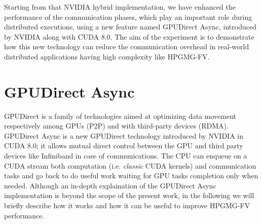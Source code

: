 \documentclass[review]{siamart1116}
\begin{document}

Starting from that NVIDIA hybrid implementation, we have enhanced the
performance of the communication phases, which play an important role during distributed executions, using a new feature named GPUDirect Async, introduced by NVIDIA along with CUDA 8.0.
The aim of the experiment is to demonstrate how this new technology
can reduce the communication overhead in real-world distributed applications having high complexity like HPGMG-FV.


\section{GPUDirect Async}\label{sec:gpudirect_async}

GPUDirect \cite{GPUDirect} is a family of technologies aimed at
optimizing data movement respectively among GPUs (P2P) and with
third-party devices (RDMA). GPUDirect Async is a new GPUDirect
technology introduced by NVIDIA in CUDA 8.0; it allows mutual direct
control between the GPU and third party devices like Infiniband in
case of communications. The CPU can enqueue on a CUDA stream both
computation (i.e. {\em classic} CUDA kernels) and communication tasks
and go back to do useful work waiting for GPU tasks completion only
when needed. Although an in-depth explaination of the GPUDirect Async
implementation is beyond the scope of the present work, in the following we will briefly describe how it works and how it can be useful to improve HPGMG-FV performance.\\
\end{document}
